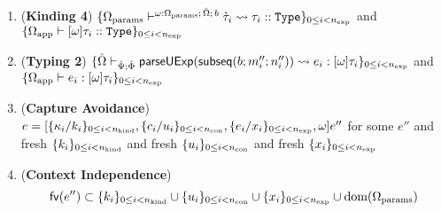 \begin{theorem}
\begin{enumerate}
	\item (\textbf{Kinding 4}) $\{\Omega_\text{params} \vdash^{\omega : \Omega_\text{params};\,{\hat\Omega};\,b} \grave{\tau}_i \leadsto \tau_i :: \texttt{Type}\}_{0 \leq i < n_\text{exp}}$ and $\{\Omega_\text{app} \vdash [\omega]\tau_i :: \texttt{Type}\}_{0 \leq i < n_\text{exp}}$
	\item (\textbf{Typing 2}) $\{{\hat\Omega} \vdash_{\hat{\Psi}; \hat\Phi} \mathsf{parseUExp}(\mathsf{subseq}(b; m''_i; n''_i)) \leadsto e_i : [\omega]\tau_i\}_{0 \leq i < n_\text{exp}}$ and $\{\Omega_\text{app} \vdash e_i : [\omega]\tau_i\}_{0 \leq i < n_\text{exp}}$
	\item (\textbf{Capture Avoidance}) $e = [\{\kappa_i/k_i\}_{0 \leq i < n_\text{kind}}, \{c_i/u_i\}_{0 \leq i < n_\text{con}}, \{e_i/x_i\}_{0 \leq i < n_\text{exp}}, \omega]e''$ for some $e''$ and fresh $\{k_i\}_{0 \leq i < n_\text{kind}}$ and fresh $\{u_i\}_{0 \leq i < n_\text{con}}$ and fresh $\{x_i\}_{0 \leq i < n_\text{exp}}$
	\item (\textbf{Context Independence}) \[\mathsf{fv}(e'') \subset \{k_i\}_{0 \leq i < n_\text{kind}} \cup \{u_i\}_{0 \leq i < n_\text{con}} \cup \{x_i\}_{0 \leq i < n_\text{exp}} \cup \text{dom}(\Omega_\text{params})\]
\end{enumerate}
\end{theorem}
\endgroup

